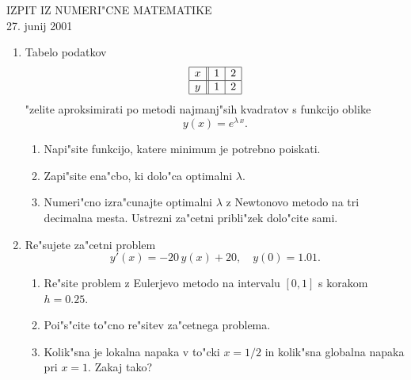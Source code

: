 
\begin{center}
  IZPIT IZ NUMERI"CNE MATEMATIKE\\
  27. junij 2001
\end{center}

\begin{enumerate}

  \item Tabelo podatkov
   $$\begin{array}{|c||c|c|}
        \hline
        x & 1 & 2\\ \hline
        y & 1 & 2\\ \hline
      \end{array}
   $$
   "zelite aproksimirati po metodi najmanj"sih kvadratov s funkcijo
   oblike 
   $$y(x)=e^{\lambda\,x}.$$ 
    
  \begin{enumerate}
   
     \item Napi"site funkcijo, katere minimum je potrebno poiskati.
  
     \item Zapi"site ena"cbo, ki dolo"ca optimalni $\lambda$.
       
     \item Numeri"cno izra"cunajte optimalni $\lambda$ z Newtonovo metodo
           na tri decimalna mesta. Ustrezni za"cetni pribli"zek dolo"cite
           sami. 
        
  \end{enumerate}

  \item Re"sujete za"cetni problem
  $$y'(x)=-20\,y(x)+20,\quad y(0)=1.01.$$
    
  \begin{enumerate}
    
    \item Re"site problem z Eulerjevo metodo na intervalu $[0,1]$ s 
          korakom $h=0.25$.
          
    \item Poi"s"cite to"cno re"sitev za"cetnega problema.
      
    \item Kolik"sna je lokalna napaka v to"cki $x=1/2$ in kolik"sna
          globalna napaka pri $x=1$. Zakaj tako?
            
  \end{enumerate} 
\end{enumerate}



         
